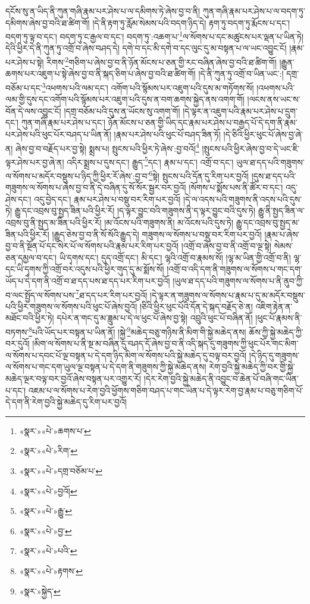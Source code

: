 དངོས་སུ་ན་ཡིད་ནི་ཀུན་གཞི་རྣམ་པར་ཤེས་པ་ལ་དམིགས་ཏེ་ཞེས་བྱ་བ་ནི། ཀུན་གཞི་རྣམ་པར་ཤེས་པ་ལ་བདག་ཏུ་དམིགས་ཞེས་བྱ་བའི་ཐ་ཚིག་གོ། །དེ་ནི་རྟག་ཏུ་རློམ་སེམས་པའི་བདག་ཉིད་དེ། རྟག་ཏུ་བདག་ཏུ་རྨོངས་པ་དང་། བདག་ཏུ་ལྟ་བ་དང་། བདག་ཏུ་ང་རྒྱལ་བ་དང་། བདག་ཏུ་:འཆག་པ་\footnote{«སྣར་»«པེ་»ཆགས་པ་}ལ་སོགས་པ་དང་མཚུངས་པར་ལྡན་པ་ཡིན་ཏེ། དེའི་ཕྱིར་དེ་ནི་ཀུན་ཏུ་འགྲོ་བ་ཞེས་བཤད་དེ། དགེ་བ་དང་མི་དགེ་བ་དང་ལུང་དུ་མ་བསྟན་པ་ལ་ཡང་འབྱུང་ངོ། །རྣམ་པར་ཤེས་པ་སྟེ། རིགས་\footnote{«སྣར་»«པེ་»རིག་}གཅིག་པ་ཞེས་བྱ་བ་ནི་ཉོན་མོངས་པ་ཅན་གྱི་རང་བཞིན་ཞེས་བྱ་བའི་ཐ་ཚིག་གོ། །རྒྱུན་ཆགས་པར་འཇུག་པ་སྟེ་ཞེས་བྱ་བ་ནི་སྐད་ཅིག་པ་ཞེས་བྱ་བའི་ཐ་ཚིག་གོ། །དེ་ནི་ཀུན་ཏུ་འགྲོ་བ་ཡིན་ཡང་:། དགྲ་བཅོམ་པ་དང་\footnote{«སྣར་»«པེ་»དགྲ་བཅོམ་པ་}འཕགས་པའི་ལམ་དང་། འགོག་པའི་སྙོམས་པར་འཇུག་པའི་དུས་མ་གཏོགས་སོ། །འཕགས་པའི་ལམ་གྱི་དུས་དང་འགོག་པའི་སྙོམས་པར་འཇུག་པའི་དུས་ན་བག་ཆགས་སྐྱེད་ནས་འགག་གོ། །ལངས་ནས་ཡང་ས་བོན་དེ་ལས་འབྱུང་ངོ། །དགྲ་བཅོམ་པའི་དུས་ན་ཡོངས་སུ་འགག་གོ། །དེ་ལྟར་ན་འཇུག་པའི་རྣམ་པར་ཤེས་པ་དྲུག་དང་། ཀུན་གཞི་རྣམ་པར་ཤེས་པ་དང་། ཉོན་མོངས་པ་ཅན་གྱི་ཡིད་དང་རྣམ་པར་ཤེས་པ་བརྒྱད་པོ་དེ་དག་ནི་རྣམ་པར་ཤེས་པའི་ཕུང་པོར་བཤད་པ་ཡིན་ནོ། །རྣམ་པར་ཤེས་པའི་ཕུང་པོ་བཤད་ཟིན་ཏོ། །དེ་ཅིའི་ཕྱིར་ཕུང་པོ་ཞེས་བྱ་ཞེ་ན། ཞེས་བྱ་བ་བརྗོད་པར་བྱ་སྟེ། སྨྲས་པ། སྤུངས་པའི་ཕྱིར་ཏེ་ཞེས་:བྱ་བའོ།\footnote{«སྣར་»«པེ་»བྱའོ།} །སྤུངས་པའི་ཕྱིར་ཞེས་བྱ་བ་དེ་ཡང་ཇི་ལྟར་ཤེས་པར་བྱ་ཞེ་ན། འདིར་སྨྲས་པ་དུས་དང་། རྒྱུད་\footnote{«སྣར་»«པེ་»རྒྱུ་}དང་། རྣམ་པ་དང་། འགྲོ་བ་དང་། ཡུལ་ཐ་དད་པའི་གཟུགས་ལ་སོགས་པ་མདོར་བསྡུས་པ་ཉིད་ཀྱི་ཕྱིར་རོ་ཞེས་:བྱ་བ་\footnote{«སྣར་»«པེ་»བྱ་}སྟེ། སྤུངས་པའི་དོན་དུ་རིག་པར་བྱའོ། །དུས་ཐ་དད་པའི་གཟུགས་ལ་སོགས་པ་ཞེས་བྱ་བ་ནི་དེ་བཞིན་དུ་སོ་སོར་སྦྱར་བར་བྱའོ། །སོགས་པ་སྨོས་པས་ནི་ཚོར་བ་དང་། འདུ་ཤེས་དང་། འདུ་བྱེད་དང་། རྣམ་པར་ཤེས་པ་བསྡུ་བར་རིག་པར་བྱའོ། །དེ་ལ་འདས་པའི་གཟུགས་ནི་འདས་པའི་དུས་ཏེ། རྒྱུ་དང་འབྲས་བུ་སྤྱད་ཟིན་པའི་ཕྱིར་རོ། །ད་ལྟར་བྱུང་བའི་གཟུགས་ནི་ད་ལྟར་བྱུང་བའི་དུས་ཏེ། རྒྱུ་ནི་སྤྱད་ཟིན་ལ་འབྲས་བུ་ནི་སྤྱད་མ་ཟིན་པའི་ཕྱིར་རོ། །མ་འོངས་པའི་གཟུགས་ནི། མ་འོངས་པའི་དུས་ཏེ། རྒྱུ་དང་འབྲས་བུ་སྤྱད་མ་ཟིན་པའི་ཕྱིར་རོ། །རྒྱུད་ཅེས་བྱ་བ་ནི་སོ་སོའི་རྒྱུད་དེ། གཟུགས་ལ་སོགས་པ་བསྡུ་བར་རིག་པར་བྱའོ། །རྣམ་པ་ཞེས་བྱ་བ་ནི་སྔོན་པོ་དང་སེར་པོ་ལ་སོགས་པའི་རྣམ་པར་རིག་པར་བྱའོ། །འགྲོ་བ་ཞེས་བྱ་བ་ནི་འགྲོ་བ་ལྔ་སྟེ། སེམས་ཅན་དམྱལ་བ་དང་། ཡི་དྭགས་དང་། དུད་འགྲོ་དང་། མི་དང་། ལྷའི་འགྲོ་བ་རྣམས་སོ། །ལྷ་མ་ཡིན་གྱི་འགྲོ་བ་ནི། ལྷ་དང་ཡི་དྭགས་ཀྱི་འགྲོ་བར་འདུས་པའི་ཕྱིར་གུད་དུ་མ་སྨོས་སོ། །འགྲོ་བ་འདི་དག་ནི་གཟུགས་ལ་སོགས་པ་གང་དག་ཡོད་པ་དེ་དག་ནི་འགྲོ་བ་ཐ་དད་པས་ཐ་དད་པར་རིག་པར་བྱའོ། །ཡུལ་ཐ་དད་པའི་གཟུགས་ལ་སོགས་པ་ནི་ནུབ་ཀྱི་བ་ལང་སྤྱོད་ལ་སོགས་པས་\footnote{«སྣར་»«པེ་»པའི་}ཐ་དད་པར་རིག་པར་བྱའོ། །དེ་ལྟར་ན་གཟུགས་ལ་སོགས་པ་རྣམ་པ་དུ་མ་མདོར་བསྡུས་པའི་ཕྱིར་གཟུགས་ལ་སོགས་པའི་ཕུང་པོ་ཞེས་བྱའོ། །ཅིའི་ཕྱིར་ཕུང་པོའི་དོན་དེ་སྐད་བརྗོད་ཅེ་ན། འཇིག་རྟེན་ན་མཐོང་བའི་ཕྱིར་ཏེ། དཔེར་ན་གང་དུ་མ་ཟླུམ་པ་དེ་ལ་ཕུང་པོ་ཞེས་བྱ་སྟེ། འབྲུའི་ཕུང་པོ་བཞིན་ནོ། །ཕུང་པོ་རྣམས་ནི་བཏགས་\footnote{«སྣར་»«པེ་»རྟགས་}པའི་ཡོད་པར་བསྟན་པ་ཡིན་ནོ། །སྐྱེ་\footnote{«སྣར་»སྐྱེད་}མཆེད་བཅུ་གཉིས་ནི་མིག་གི་སྐྱེ་མཆེད་ནས། ཆོས་ཀྱི་སྐྱེ་མཆེད་ཀྱི་བར་དུའོ། །མིག་ལ་སོགས་པ་ནི་སྔ་མ་བཞིན་དུ་བཤད་དོ་ཞེས་བྱ་བ་ནི་འདི་སྐད་དུ་གཟུགས་ཀྱི་ཕུང་པོར་གང་མིག་ལ་སོགས་པ་དབང་པོ་ལྔ་བསྟན་པ་དེ་དག་ཉིད་མིག་ལ་སོགས་པའི་སྐྱེ་མཆེད་དུ་བལྟ་བར་བྱའོ། །དེ་ཉིད་དུ་གཟུགས་ལ་སོགས་པ་གང་དག་ཡུལ་ལྔ་བསྟན་པ་དེ་དག་ནི་གཟུགས་ཀྱི་སྐྱེ་མཆེད་ནས། རེག་བྱའི་སྐྱེ་མཆེད་ཀྱི་བར་གྱི་སྐྱེ་མཆེད་ལྔར་བལྟ་བར་བྱའོ་ཞེས་བསྟན་པར་འགྱུར་རོ། །དེར་རེག་བྱའི་སྐྱེ་མཆེད་ནི་འབྱུང་བ་ཆེན་པོ་བཞི་གང་ཡིན་པ་དང་། འཇམ་པ་ལ་སོགས་པ་རེག་བྱའི་ཕྱོགས་གཅིག་བཤད་པ་གང་ཡིན་པ་དེ་ལྟར་རེག་བྱ་རྣམ་པ་བཅུ་གཅིག་པོ་དེ་དག་ནི་རེག་བྱའི་སྐྱེ་མཆེད་དུ་རིག་པར་བྱའོ། 